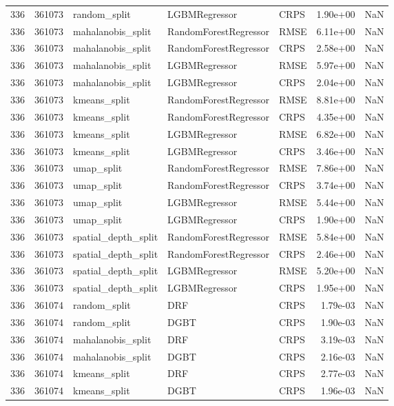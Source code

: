 \begin{tabular}{rrlllrr}
336 & 361073 & random\_split & LGBMRegressor & CRPS & 1.90e+00 & NaN \\
336 & 361073 & mahalanobis\_split & RandomForestRegressor & RMSE & 6.11e+00 & NaN \\
336 & 361073 & mahalanobis\_split & RandomForestRegressor & CRPS & 2.58e+00 & NaN \\
336 & 361073 & mahalanobis\_split & LGBMRegressor & RMSE & 5.97e+00 & NaN \\
336 & 361073 & mahalanobis\_split & LGBMRegressor & CRPS & 2.04e+00 & NaN \\
336 & 361073 & kmeans\_split & RandomForestRegressor & RMSE & 8.81e+00 & NaN \\
336 & 361073 & kmeans\_split & RandomForestRegressor & CRPS & 4.35e+00 & NaN \\
336 & 361073 & kmeans\_split & LGBMRegressor & RMSE & 6.82e+00 & NaN \\
336 & 361073 & kmeans\_split & LGBMRegressor & CRPS & 3.46e+00 & NaN \\
336 & 361073 & umap\_split & RandomForestRegressor & RMSE & 7.86e+00 & NaN \\
336 & 361073 & umap\_split & RandomForestRegressor & CRPS & 3.74e+00 & NaN \\
336 & 361073 & umap\_split & LGBMRegressor & RMSE & 5.44e+00 & NaN \\
336 & 361073 & umap\_split & LGBMRegressor & CRPS & 1.90e+00 & NaN \\
336 & 361073 & spatial\_depth\_split & RandomForestRegressor & RMSE & 5.84e+00 & NaN \\
336 & 361073 & spatial\_depth\_split & RandomForestRegressor & CRPS & 2.46e+00 & NaN \\
336 & 361073 & spatial\_depth\_split & LGBMRegressor & RMSE & 5.20e+00 & NaN \\
336 & 361073 & spatial\_depth\_split & LGBMRegressor & CRPS & 1.95e+00 & NaN \\
336 & 361074 & random\_split & DRF & CRPS & 1.79e-03 & NaN \\
336 & 361074 & random\_split & DGBT & CRPS & 1.90e-03 & NaN \\
336 & 361074 & mahalanobis\_split & DRF & CRPS & 3.19e-03 & NaN \\
336 & 361074 & mahalanobis\_split & DGBT & CRPS & 2.16e-03 & NaN \\
336 & 361074 & kmeans\_split & DRF & CRPS & 2.77e-03 & NaN \\
336 & 361074 & kmeans\_split & DGBT & CRPS & 1.96e-03 & NaN \\

\end{tabular}
